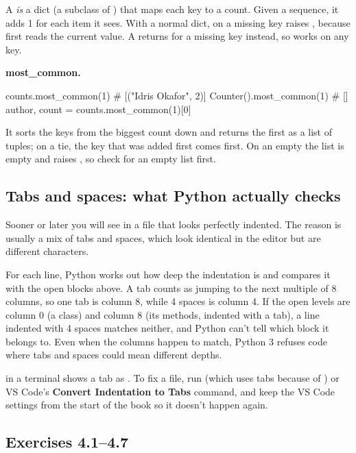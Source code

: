 A  \emph{is} a dict (a subclass of ) that maps each key to a count. Given a sequence, it adds 1 for each item it sees. With a normal dict,  on a missing key raises , because \cd{+=} first reads the current value. A  returns  for a missing key instead, so \cd{+=} works on any key.

\textbf{most\_common.}

\begin{py}
counts.most_common(1)      # [("Idris Okafor", 2)]
Counter().most_common(1)   # []
author, count = counts.most_common(1)[0]
\end{py}

It sorts the keys from the biggest count down and returns the first  as a list of  tuples; on a tie, the key that was added first comes first. On an empty  the list is empty and \cd{[0]} raises , so check for an empty list first.

\subsection{Tabs and spaces: what Python actually checks}

Sooner or later you will see  in a file that looks perfectly indented. The reason is usually a mix of tabs and spaces, which look identical in the editor but are different characters.

For each line, Python works out how deep the indentation is and compares it with the open blocks above. A tab counts as jumping to the next multiple of 8 columns, so one tab is column 8, while 4 spaces is column 4. If the open levels are column 0 (a class) and column 8 (its methods, indented with a tab), a line indented with 4 spaces matches neither, and Python can't tell which block it belongs to. Even when the columns happen to match, Python 3 refuses code where tabs and spaces could mean different depths.

 in a terminal shows a tab as . To fix a file, run  (which uses tabs because of ) or VS Code's \textbf{Convert Indentation to Tabs} command, and keep the VS Code settings from the start of the book so it doesn't happen again.

\subsection{Exercises 4.1--4.7}

